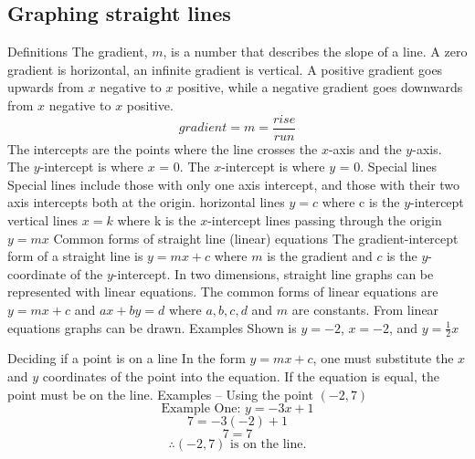 \begin{outline}
\subsection{Graphing straight lines}
	\1 Definitions
		\2 The gradient, $m$, is a number that describes the slope of a line. A zero gradient is horizontal, an infinite gradient is vertical. A positive gradient goes upwards from $x$ negative to $x$ positive, while a negative gradient goes downwards from $x$ negative to $x$ positive.
			\[gradient = m = \frac{rise}{run}\]
		\2 The intercepts are the points where the line crosses the $x$-axis and the $y$-axis.
			\3 The $y$-intercept is where $x$ = 0.
			\3 The $x$-intercept is where $y$ = 0.
	\1 Special lines
		\2 Special lines include those with only one axis intercept, and those with their two axis intercepts both at the origin.
			\3 horizontal lines $y = c$ where c is the $y$-intercept
			\3 vertical lines $x = k$ where k is the $x$-intercept
			\3 lines passing through the origin $y = mx$
	\1 Common forms of straight line (linear) equations
		\2 The gradient-intercept form of a straight line is $y = mx + c$ where $m$ is the gradient and $c$ is the $y$-coordinate of the $y$-intercept.
		\2 In two dimensions, straight line graphs can be represented with linear equations. The common forms of linear equations are $y = mx+c$ and $ax+by=d$ where $a, b, c, d$ and $m$ are constants. From linear equations graphs can be drawn.
			\3 Examples
			\3 Shown is $y = -2$, $x = -2$, and $y = \frac{1}{2}x$
\begin{center}
\end{center}
	\1 Deciding if a point is on a line
		\2 In the form $y = mx + c$, one must substitute the $x$ and $y$ coordinates of the point into the equation. If the equation is equal, the point must be on the line.
			\3 Examples -- Using the point $(-2, 7)$
				\[\text{Example One: }y = -3x + 1\]
				\[7 = -3(-2) + 1\]
				\[7 = 7\]
				\[\therefore (-2,7) \text{ is on the line.}\]
				

\end{outline}
